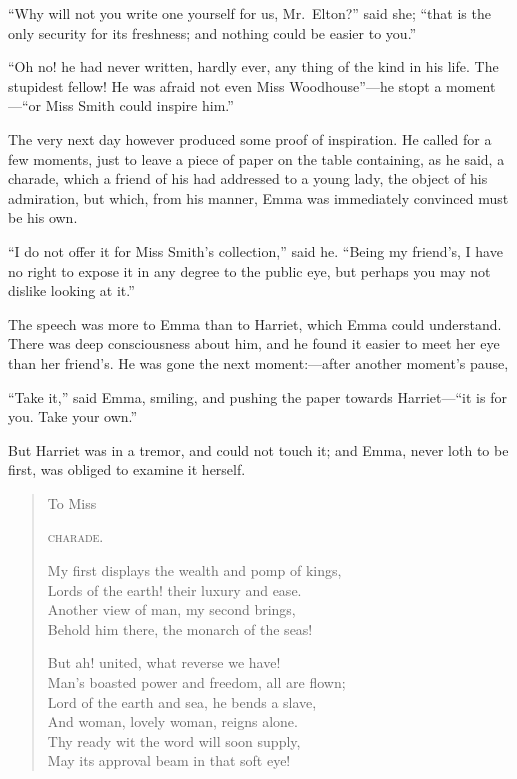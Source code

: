 ``Why will not you write one yourself for us, Mr.\ Elton?'' said she;
``that is the only security for its freshness; and nothing could be
easier to you.''

``Oh no! he had never written, hardly ever, any thing of the kind
in his life.  The stupidest fellow! He was afraid not even Miss
Woodhouse''---he stopt a moment---``or Miss Smith could inspire him.''

The very next day however produced some proof of inspiration.
He called for a few moments, just to leave a piece of paper on the
table containing, as he said, a charade, which a friend of his had
addressed to a young lady, the object of his admiration, but which,
from his manner, Emma was immediately convinced must be his own.

``I do not offer it for Miss Smith's collection,'' said he.
``Being my friend's, I have no right to expose it in any degree
to the public eye, but perhaps you may not dislike looking at it.''

The speech was more to Emma than to Harriet, which Emma
could understand.  There was deep consciousness about him,
and he found it easier to meet her eye than her friend's.
He was gone the next moment:---after another moment's pause,

``Take it,'' said Emma, smiling, and pushing the paper towards
Harriet---``it is for you.  Take your own.''

But Harriet was in a tremor, and could not touch it; and Emma,
never loth to be first, was obliged to examine it herself.

\begin{verse}
        To Miss \gdash{}

          \textsc{charade.}

    My first displays the wealth and pomp of kings,\\
      Lords of the earth! their luxury and ease.\\
    Another view of man, my second brings,\\
      Behold him there, the monarch of the seas!

    But ah! united, what reverse we have!\\
      Man's boasted power and freedom, all are flown;\\
    Lord of the earth and sea, he bends a slave,\\
      And woman, lovely woman, reigns alone.\\

      Thy ready wit the word will soon supply,\\
      May its approval beam in that soft eye!
\end{verse}

